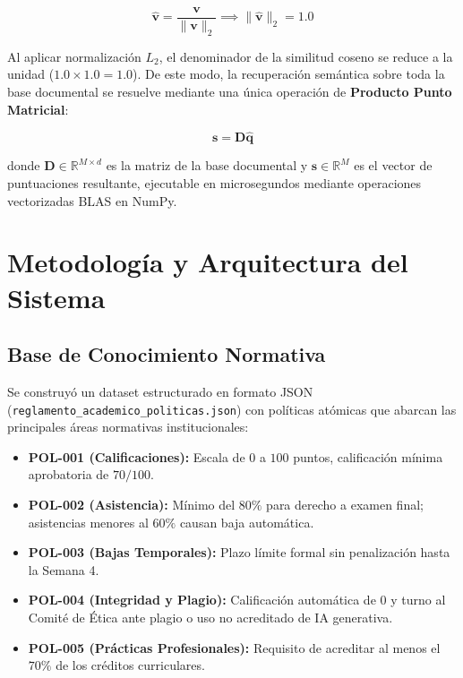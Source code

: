 \documentclass[12pt,letterpaper]{article}
\begin{document}
\begin{equation}
\hat{\mathbf{v}} = \frac{\mathbf{v}}{\|\mathbf{v}\|_2} \implies \|\hat{\mathbf{v}}\|_2 = 1.0
\end{equation}

Al aplicar normalización $L_2$, el denominador de la similitud coseno se reduce a la unidad ($1.0 \times 1.0 = 1.0$). De este modo, la recuperación semántica sobre toda la base documental se resuelve mediante una única operación de \textbf{Producto Punto Matricial}:

\begin{equation}
\mathbf{s} = \mathbf{D} \hat{\mathbf{q}}
\end{equation}

\noindent donde $\mathbf{D} \in \mathbb{R}^{M \times d}$ es la matriz de la base documental y $\mathbf{s} \in \mathbb{R}^M$ es el vector de puntuaciones resultante, ejecutable en microsegundos mediante operaciones vectorizadas BLAS en NumPy.

\section{Metodología y Arquitectura del Sistema}

\subsection{Base de Conocimiento Normativa}
Se construyó un dataset estructurado en formato JSON (\texttt{reglamento\_academico\_politicas.json}) con políticas atómicas que abarcan las principales áreas normativas institucionales:
\begin{itemize}
    \item \textbf{POL-001 (Calificaciones):} Escala de $0$ a $100$ puntos, calificación mínima aprobatoria de $70/100$.
    \item \textbf{POL-002 (Asistencia):} Mínimo del $80\%$ para derecho a examen final; asistencias menores al $60\%$ causan baja automática.
    \item \textbf{POL-003 (Bajas Temporales):} Plazo límite formal sin penalización hasta la Semana 4.
    \item \textbf{POL-004 (Integridad y Plagio):} Calificación automática de $0$ y turno al Comité de Ética ante plagio o uso no acreditado de IA generativa.
    \item \textbf{POL-005 (Prácticas Profesionales):} Requisito de acreditar al menos el $70\%$ de los créditos curriculares.
\end{itemize}
\end{document}
